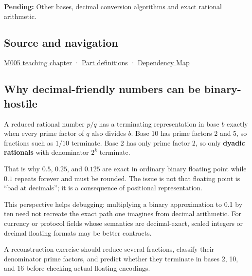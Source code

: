 \textbf{Pending:} Other bases, decimal conversion algorithms and exact rational arithmetic.

\subsection{Source and navigation}\label{appendix-2a2f1b74bdd3-source-and-navigation}

\hyperref[01-foundations-i-ch001-when-arithmetic-meets-uncertainty]{M005 teaching chapter} · \hyperref[appendix-fd090d982a15-m005---parts-77-88]{Part definitions} · \hyperref[appendix-4ad47bdd269a]{Dependency Map}

\subsection{Why decimal-friendly numbers can be binary-hostile}\label{appendix-2a2f1b74bdd3-why-decimal-friendly-numbers-can-be-binary-hostile}

A reduced rational number \(p/q\) has a terminating representation in base \(b\) exactly when every prime factor of \(q\) also divides \(b\). Base 10 has prime factors 2 and 5, so fractions such as \(1/10\) terminate. Base 2 has only prime factor 2, so only \textbf{dyadic rationals} with denominator \(2^k\) terminate.

That is why \(0.5\), \(0.25\), and \(0.125\) are exact in ordinary binary floating point while \(0.1\) repeats forever and must be rounded. The issue is not that floating point is ``bad at decimals''; it is a consequence of positional representation.

This perspective helps debugging: multiplying a binary approximation to 0.1 by ten need not recreate the exact path one imagines from decimal arithmetic. For currency or protocol fields whose semantics are decimal-exact, scaled integers or decimal floating formats may be better contracts.

A reconstruction exercise should reduce several fractions, classify their denominator prime factors, and predict whether they terminate in bases 2, 10, and 16 before checking actual floating encodings.
